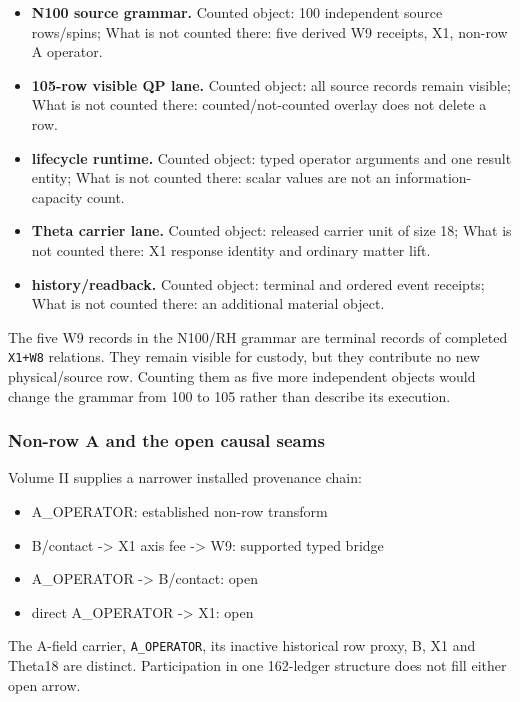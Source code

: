 \begin{itemize}
\tightlist
\item
  \textbf{N100 source grammar.} Counted object: 100 independent source
  rows/spins; What is not counted there: five derived W9 receipts, X1,
  non-row A operator.
\item
  \textbf{105-row visible QP lane.} Counted object: all source records
  remain visible; What is not counted there: counted/not-counted overlay
  does not delete a row.
\item
  \textbf{lifecycle runtime.} Counted object: typed operator arguments
  and one result entity; What is not counted there: scalar values are
  not an information-capacity count.
\item
  \textbf{Theta carrier lane.} Counted object: released carrier unit of
  size 18; What is not counted there: X1 response identity and ordinary
  matter lift.
\item
  \textbf{history/readback.} Counted object: terminal and ordered event
  receipts; What is not counted there: an additional material object.
\end{itemize}

The five W9 records in the N100/RH grammar are terminal records of
completed \texttt{X1+W8} relations. They remain visible for custody, but
they contribute no new physical/source row. Counting them as five more
independent objects would change the grammar from 100 to 105 rather than
describe its execution.

\subsubsection{Non-row A and the open causal
seams}\label{viii-ch05-non-row-a-and-the-open-causal-seams}

Volume II supplies a narrower installed provenance chain:

\begin{itemize}
\tightlist
\item
  A\_OPERATOR: established non-row transform
\item
  B/contact -\textgreater{} X1 axis fee -\textgreater{} W9: supported
  typed bridge
\item
  A\_OPERATOR -\textgreater{} B/contact: open
\item
  direct A\_OPERATOR -\textgreater{} X1: open
\end{itemize}

The A-field carrier, \texttt{A\_OPERATOR}, its inactive historical row
proxy, B, X1 and Theta18 are distinct. Participation in one 162-ledger
structure does not fill either open arrow.

